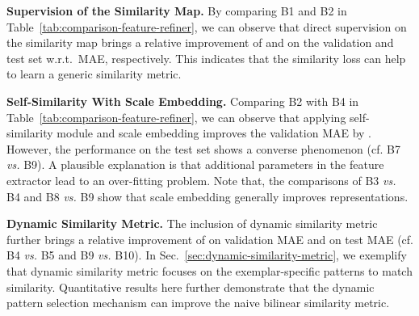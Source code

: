 \documentclass[10pt,twocolumn,letterpaper]{article}
\newcommand{\margin}{\vspace{3pt}\noindent}
\begin{document}
\margin
\textbf{Supervision of the Similarity Map.}
By comparing B1 and B2 in Table~\ref{tab:comparison-feature-refiner}, we can observe that direct supervision on the similarity map brings a relative improvement of  and  on the validation and test set w.r.t.\ MAE, respectively. This indicates that the similarity loss can help to learn a generic similarity metric. 

\margin
\textbf{Self-Similarity With Scale Embedding.}
Comparing B2 with B4 in Table~\ref{tab:comparison-feature-refiner}, we can observe that applying self-similarity module and scale embedding improves the validation MAE by . However, the performance on the test set shows a converse phenomenon (cf. B7 \textit{vs.} B9). A plausible explanation is that additional parameters in the feature extractor lead to an over-fitting problem. Note that, the comparisons of B3 \textit{vs.} B4 and B8 \textit{vs.} B9 show that scale embedding generally improves representations.

\margin
\textbf{Dynamic Similarity Metric.}
The inclusion of dynamic similarity metric further brings a relative improvement of  on validation MAE and  on test MAE (cf. B4 \textit{vs.} B5 and B9 \textit{vs.} B10). In Sec.~\ref{sec:dynamic-similarity-metric}, we exemplify that dynamic similarity metric focuses on the exemplar-specific patterns to match similarity. Quantitative results here further demonstrate that the dynamic pattern selection mechanism can improve the naive bilinear similarity metric. 
\end{document}
